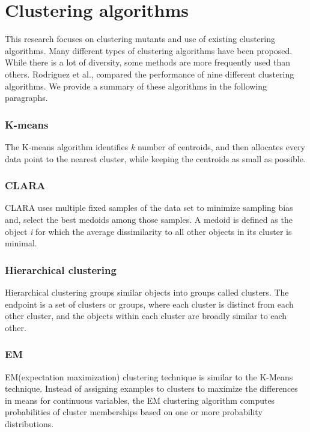 \documentclass[../main]{subfiles}
\begin{document}
\section{Clustering algorithms}
This research focuses on clustering mutants and use of existing clustering algorithms. 
Many different types of clustering algorithms have been proposed\cite{Rodriguez2019}. While there is a lot of diversity, some methods are more frequently used than others\cite{Wu2008TopMining}. 
Rodriguez et al., compared the performance of nine different clustering algorithms.
We provide a summary of these algorithms in the following paragraphs.

\subsubsection{K-means} 
The K-means algorithm identifies \textit{k} number of centroids, and then allocates every data point to the nearest cluster, while keeping the centroids as small as possible\cite{Hartigan1979AlgorithmAlgorithm}.

\subsubsection{CLARA} 
CLARA uses multiple fixed samples of the data set to minimize sampling bias and, select the best medoids among those samples\cite{Sarle1991FindingAnalysis.}.
A medoid is defined as the object \textit{i} for which the average dissimilarity to all other objects in its cluster is minimal\cite{Sarle1991FindingAnalysis.}.
\subsubsection{Hierarchical clustering} 
Hierarchical clustering groups similar objects into groups called clusters\cite{Fraley1998HowAnalysis}. 
The endpoint is a set of clusters or groups, where each cluster is distinct from each other cluster, and the objects within each cluster are broadly similar to each other\cite{Fraley1998HowAnalysis}.
\subsubsection{EM} 
EM(expectation maximization) clustering technique is similar to the K-Means technique\cite{Fv1996TheAlgorithm}.
Instead of assigning examples to clusters to maximize the differences in means for continuous variables, the EM clustering algorithm computes probabilities of cluster memberships based on one or more probability distributions\cite{Fv1996TheAlgorithm}. 
\end{document}
